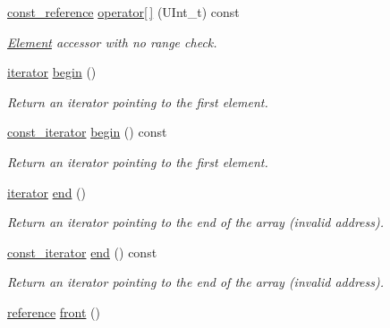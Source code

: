 \begin{DoxyCompactItemize}
\hyperlink{classpanda_1_1Collection_a0b74becc406f47de15442c670ae70caf}{const\_\-reference} \hyperlink{classpanda_1_1Collection_acc5f2873f1e8d2def48a5f0ed17a56e0}{operator\mbox{[}$\,$\mbox{]}} (UInt\_\-t) const 
\begin{DoxyCompactList}\small\item\em \hyperlink{classpanda_1_1Element}{Element} accessor with no range check. \item\end{DoxyCompactList}\item 
\hyperlink{classpanda_1_1utils_1_1Iterator}{iterator} \hyperlink{classpanda_1_1Collection_a353e28bfcd4afe0d3cf9f949bffe21dc}{begin} ()
\begin{DoxyCompactList}\small\item\em Return an iterator pointing to the first element. \item\end{DoxyCompactList}\item 
\hyperlink{classpanda_1_1utils_1_1Iterator}{const\_\-iterator} \hyperlink{classpanda_1_1Collection_adfb529320065335b26ad488ab58e30e4}{begin} () const 
\begin{DoxyCompactList}\small\item\em Return an iterator pointing to the first element. \item\end{DoxyCompactList}\item 
\hyperlink{classpanda_1_1utils_1_1Iterator}{iterator} \hyperlink{classpanda_1_1Collection_ab0c911f9b8ea2734f2f255ab2b65cd8f}{end} ()
\begin{DoxyCompactList}\small\item\em Return an iterator pointing to the end of the array (invalid address). \item\end{DoxyCompactList}\item 
\hyperlink{classpanda_1_1utils_1_1Iterator}{const\_\-iterator} \hyperlink{classpanda_1_1Collection_a476ee3bc2ac965600622a57e39ea1c58}{end} () const 
\begin{DoxyCompactList}\small\item\em Return an iterator pointing to the end of the array (invalid address). \item\end{DoxyCompactList}\item 
\hyperlink{classpanda_1_1Collection_a908a535fcc02ad985ac9eb974f02546f}{reference} \hyperlink{classpanda_1_1Collection_a13746b6da09a9db21c7adbc9125862b5}{front} ()

\end{DoxyCompactItemize}
